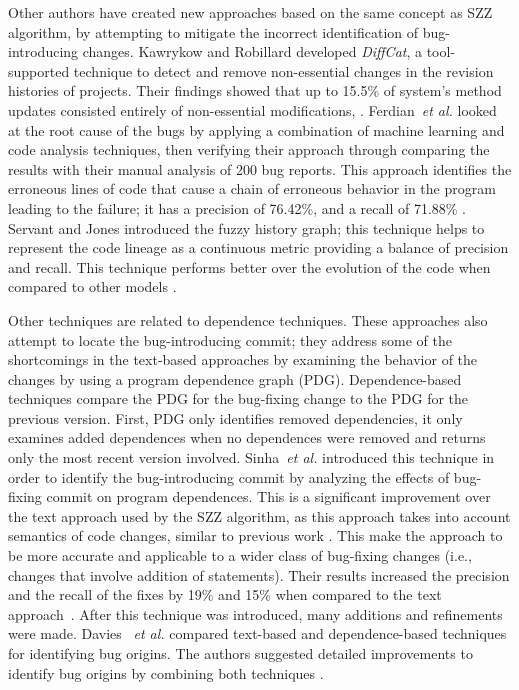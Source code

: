 \documentclass[a4paper, 12pt]{book}
\begin{document}
Other authors have created new approaches based on the same concept as SZZ algorithm, by attempting to mitigate the incorrect identification of bug-introducing changes. Kawrykow and Robillard developed \emph{DiffCat}, a tool-supported technique to detect and remove non-essential changes in the revision histories of projects. Their findings showed that up to 15.5\% of system's method updates consisted entirely of non-essential modifications, \cite{kawrykow2011non}. Ferdian~\textit{et al.} looked at the root cause of the bugs by applying a combination of machine learning and code analysis techniques, then verifying their approach through comparing the results with their manual analysis of 200 bug reports. This approach identifies the erroneous lines of code that cause a chain of erroneous behavior in the program leading to the failure; it has a precision of 76.42\%, and a recall of 71.88\% \cite{thung2013automatic}. Servant and Jones introduced the fuzzy history graph; this technique helps to represent the code lineage as a continuous metric providing a balance of precision and recall. This technique performs better over the evolution of the code when compared to other models \cite{servant2017fuzzy}.  

Other techniques are related to dependence techniques. These approaches also attempt to locate the bug-introducing commit; they address some of the shortcomings in the text-based approaches by examining the behavior of the changes by using a program dependence graph (PDG). Dependence-based techniques compare the PDG for the bug-fixing change to the PDG for the previous version. First, PDG only identifies removed dependencies, it only examines added dependences when no dependences were removed and returns only the most recent version involved. Sinha~\textit{et al.} introduced this technique in order to identify the bug-introducing commit by analyzing the effects of bug-fixing commit on program dependences. This is a significant improvement over the text approach used by the SZZ algorithm, as this approach takes into account semantics of code changes, similar to previous work \cite{horwitz1990identifying, binkley1992using}. This make the approach to be more accurate and applicable to a wider class of bug-fixing changes (i.e., changes that involve addition of statements). Their results increased the precision and the recall of the fixes by 19\% and 15\% when compared to the text approach~\cite{sinha2010buginnings}.  After this technique was introduced, many additions and refinements were made. Davies ~\textit{et al.} compared text-based and dependence-based techniques for identifying bug origins. The authors suggested detailed improvements to identify bug origins by combining both techniques \cite{davies2014comparing}. 
\end{document}
